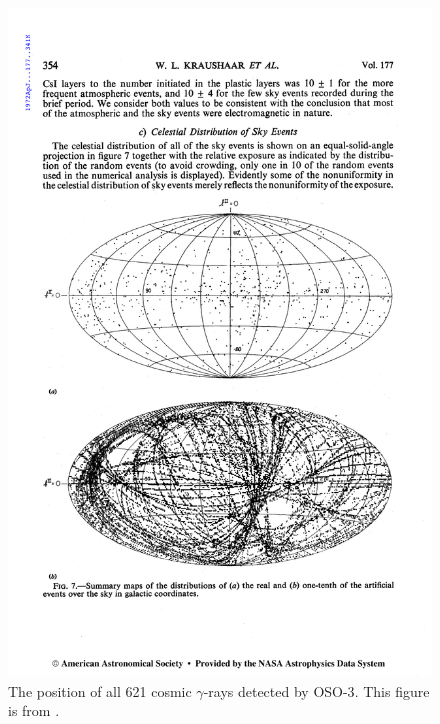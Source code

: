 \begin{figure}[htb]
\includegraphics{chapters/introduction/figures/kraushaar_et_al_1972_skymap.pdf}
\caption{The position of all 621 cosmic $\gamma$-rays
detected by \ac{OSO-3}. This figure is from 
\cite{kraushaar_1972_high-energy-cosmic}. }
\end{figure}





